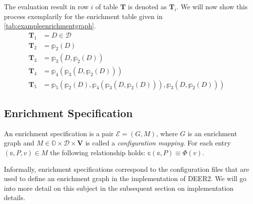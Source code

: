 The evaluation result in row $i$ of table $\mathbf{T}$ is denoted as $\mathbf{T}_i$.
We will now show this process exemplarily for the enrichment table given in \autoref{tab:exampleenrichmentgraph}.
\begin{equation*}
\begin{aligned}
  \mathbf{T}_1 & = D\in\mathcal{D} \\
  \mathbf{T}_2 & = \mathbb{p}_2\left(D\right) \\
  \mathbf{T}_3 & = \mathbb{p}_3\left(D, \mathbb{p}_2\left(D\right)\right) \\
  \mathbf{T}_4 & = \mathbb{p}_4\left(\mathbb{p}_3\left(D, \mathbb{p}_2\left(D\right)\right)\right) \\
  \mathbf{T}_5 & = \mathbb{p}_5\left(\mathbb{p}_2\left(D\right),\mathbb{p}_4\left(\mathbb{p}_3\left(D, \mathbb{p}_2\left(D\right)\right)\right), \mathbb{p}_3\left(D, \mathbb{p}_2\left(D\right)\right)\right)
\end{aligned}
\end{equation*}
%

\subsection{Enrichment Specification}

An enrichment specification is a pair $\mathcal{E}=(G, M)$, where $G$ is an enrichment graph and $M\in\mathbb{O}\times\mathcal{D}\times\mathbf{V}$ is called a \emph{configuration mapping}.
For each entry $(\mathbb{o}, P, v)\in M$ the following relationship holds: $\mathbb{c}(\mathbb{o}, P) \equiv \Phi(v)$.

Informally, enrichment specifications correspond to the configuration files that are used to define an enrichment graph in the implementation of \ac{DEER2}.
We will go into more detail on this subject in the subsequent section on implementation details.

